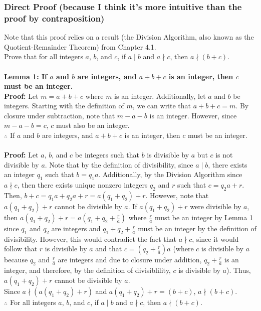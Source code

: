 \documentclass[table]{article}
\begin{document}
\subsubsection{Direct Proof (because I think it's more intuitive than the proof by contraposition)}
Note that this proof relies on a result (the Division Algorithm, also known as the Quotient-Remainder Theorem) from Chapter 4.1.\\
Prove that for all integers $a$, $b$, and $c$, if $a \mid b$ and $a \nmid c$, then $a \nmid (b + c)$.\\~\\
\textbf{Lemma 1: If $a$ and $b$ are integers, and $a+b+c$ is an integer, then $c$ must be an integer.}\\
\textbf{Proof:} Let $m=a+b+c$ where $m$ is an integer. Additionally, let $a$ and $b$ be integers. Starting with the definition of $m$, we can write that $a+b+c=m$. By closure under subtraction, note that $m-a-b$ is an integer. However, since $m-a-b=c$, $c$ must also be an integer.\\
$\therefore$ If $a$ and $b$ are integers, and $a+b+c$ is an integer, then $c$ must be an integer.\\~\\
\textbf{Proof:} Let $a$, $b$, and $c$ be integers such that $b$ is divisible by $a$ but $c$ is not divisible by $a$. Note that by the definition of divisibility, since $a \mid b$, there exists an integer $q_1$ such that $b = q_1a$. Additionally, by the Division Algorithm since $a \nmid c$, then there exists unique nonzero integers $q_2$ and $r$ such that $c = q_2a + r$. Then, $b+c=q_1a+q_2a+r=a(q_1+q_2)+r$. However, note that $a(q_1+q_2)+r$ cannot be divisible by $a$. If $a(q_1+q_2)+r$ were divisible by $a$, then $a(q_1+q_2)+r=a(q_1+q_2+\frac{r}{a})$ where $\frac{r}{a}$ must be an integer by Lemma 1 since $q_1$ and $q_2$ are integers and $q_1+q_2+\frac{r}{a}$ must be an integer by the definition of divisibility. However, this would contradict the fact that $a \nmid c$, since it would follow that $r$ is divisible by $a$ and that $c=(q_2+\frac{r}{a})a$ (where $c$ is divisible by $a$ because $q_2$ and $\frac{r}{a}$ are integers and due to closure under addition, $q_2+\frac{r}{a}$ is an integer, and therefore, by the definition of divisiblility, $c$ is divisible by $a$). Thus, $a(q_1+q_2)+r$ cannot be divisible by $a$.\\
Since $a \nmid (a(q_1+q_2)+r)$ and $a(q_1+q_2)+r = (b+c)$, $a \nmid (b+c)$.\\
$\therefore$ For all integers $a$, $b$, and $c$, if $a \mid b$ and $a \nmid c$, then $a \nmid (b + c)$.
\end{document}
